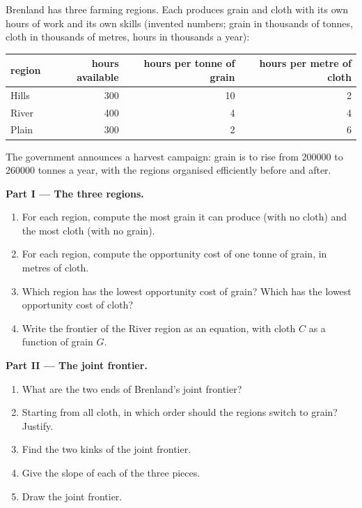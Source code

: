 \begin{problem}
\label{pb:g10:production-possibility-frontier:1}
Brenland has three farming regions. Each produces grain and cloth with its own hours of work and its own
skills (invented numbers; grain in thousands of tonnes, cloth in thousands of metres, hours in thousands
a year):

\begin{center}
\small
\begin{tabular}{lrrr}
\toprule
region & hours available & hours per tonne of grain & hours per metre of cloth \\
\midrule
Hills & 300 & 10 & 2 \\
River & 400 & 4 & 4 \\
Plain & 300 & 2 & 6 \\
\bottomrule
\end{tabular}
\end{center}

\noindent The government announces a harvest campaign: grain is to rise from \num{200000} to
\num{260000} tonnes a year, with the regions organised efficiently before and after.

\medskip
\noindent\textbf{Part I --- The three regions.}
\begin{enumerate}
\item For each region, compute the most grain it can produce (with no cloth) and the most cloth (with no
  grain).
\item For each region, compute the opportunity cost of one tonne of grain, in metres of cloth.
\item Which region has the lowest opportunity cost of grain? Which has the lowest opportunity cost of
  cloth?
\item Write the frontier of the River region as an equation, with cloth $C$ as a function of grain $G$.
\end{enumerate}

\medskip
\noindent\textbf{Part II --- The joint frontier.}
\begin{enumerate}[resume]
\item What are the two ends of Brenland's joint frontier?
\item Starting from all cloth, in which order should the regions switch to grain? Justify.
\item Find the two kinks of the joint frontier.
\item Give the slope of each of the three pieces.
\item Draw the joint frontier.
\end{enumerate}


\end{problem}
